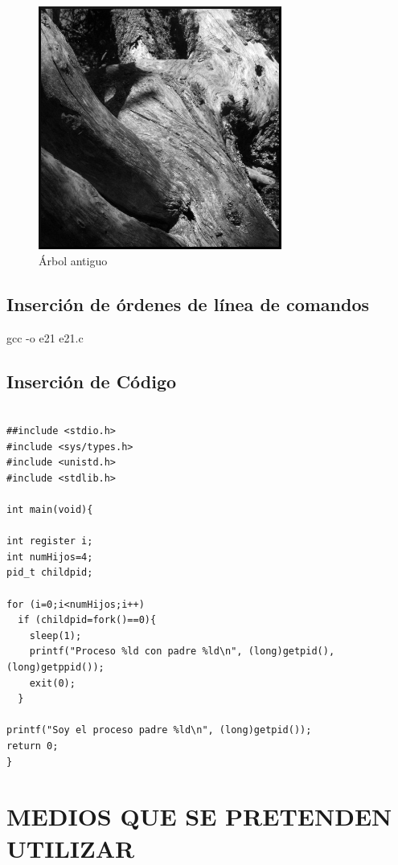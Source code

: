 \documentclass{pre-tfg}
\begin{document}
\begin{figure}[!h]
\centering
   \includegraphics[width=8cm]{figures/tree04.jpg}
\caption{Árbol antiguo}
\end{figure}

\subsection{Inserción de órdenes de línea de comandos}

\begin{listing}[style=consola, numbers=none]
 gcc  -o e21 e21.c
\end{listing}





\subsection{Inserción de Código}

\begin{lstlisting}[caption=Ejemplo de código,style=C]

##include <stdio.h>
#include <sys/types.h>
#include <unistd.h>
#include <stdlib.h>

int main(void){

int register i;
int numHijos=4;
pid_t childpid;

for (i=0;i<numHijos;i++)
  if (childpid=fork()==0){
    sleep(1);
    printf("Proceso %ld con padre %ld\n", (long)getpid(), (long)getppid());
    exit(0);
  }

printf("Soy el proceso padre %ld\n", (long)getpid());
return 0;
}
\end{lstlisting}




\section{MEDIOS QUE SE PRETENDEN UTILIZAR}
\end{document}
